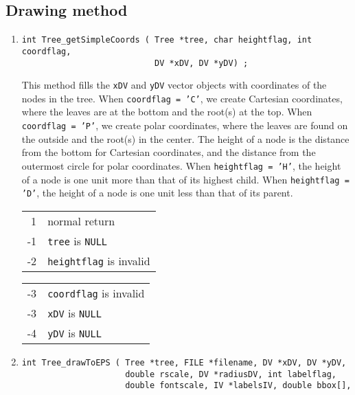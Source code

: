 \subsection{Drawing method}
\label{subsection:Tree:proto:drawing}
\par
\begin{enumerate}
\item
\begin{verbatim}
int Tree_getSimpleCoords ( Tree *tree, char heightflag, int coordflag, 
                           DV *xDV, DV *yDV) ;
\end{verbatim}
This method fills the {\tt xDV} and {\tt yDV} vector objects with
coordinates of the nodes in the tree.
When {\tt coordflag = 'C'}, we create Cartesian coordinates,
where the leaves are at the bottom and the root(s) at the top.
When {\tt coordflag = 'P'}, we create polar coordinates, where
the leaves are found on the outside and the root(s) in the center.
The height of a node 
is the distance from the bottom for Cartesian coordinates,
and the distance from the outermost circle for polar coordinates.
When {\tt heightflag = 'H'}, the height of a node 
is one unit more than that of its highest child.
When {\tt heightflag = 'D'}, the height of a node 
is one unit less than that of its parent.
\par {}
\begin{center}
\begin{tabular}{rl}
 1 & normal return \\
-1 & {\tt tree} is {\tt NULL} \\
-2 & {\tt heightflag} is invalid 
\end{tabular}
\quad
\begin{tabular}{rl}
-3 & {\tt coordflag} is invalid \\
-3 & {\tt xDV} is {\tt NULL} \\
-4 & {\tt yDV} is {\tt NULL}
\end{tabular}
\end{center}
\item
\begin{verbatim}
int Tree_drawToEPS ( Tree *tree, FILE *filename, DV *xDV, DV *yDV, 
                     double rscale, DV *radiusDV, int labelflag, 
                     double fontscale, IV *labelsIV, double bbox[], 

\end{verbatim}
\end{enumerate}
